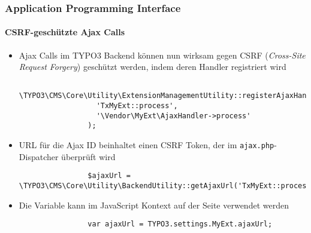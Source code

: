 \begin{frame}[fragile]
	\frametitle{Application Programming Interface}
	\framesubtitle{CSRF-geschützte Ajax Calls}

	\lstset{
		basicstyle=\tiny\ttfamily
	}

	\begin{itemize}
		\item Ajax Calls im TYPO3 Backend können nun wirksam gegen CSRF (\textit{Cross-Site Request Forgery}) geschützt werden, indem deren Handler registriert wird

			\begin{lstlisting}
				\TYPO3\CMS\Core\Utility\ExtensionManagementUtility::registerAjaxHandler(
				  'TxMyExt::process',
				  '\Vendor\MyExt\AjaxHandler->process'
				);
			\end{lstlisting}

		\item URL für die Ajax ID beinhaltet einen CSRF Token, der im \texttt{ajax.php}-Dispatcher überprüft wird

			\begin{lstlisting}
				$ajaxUrl = \TYPO3\CMS\Core\Utility\BackendUtility::getAjaxUrl('TxMyExt::process');
			\end{lstlisting}

		\item Die Variable kann im JavaScript Kontext auf der Seite verwendet werden

			\begin{lstlisting}
				var ajaxUrl = TYPO3.settings.MyExt.ajaxUrl;
			\end{lstlisting}

	\end{itemize}

\end{frame}


